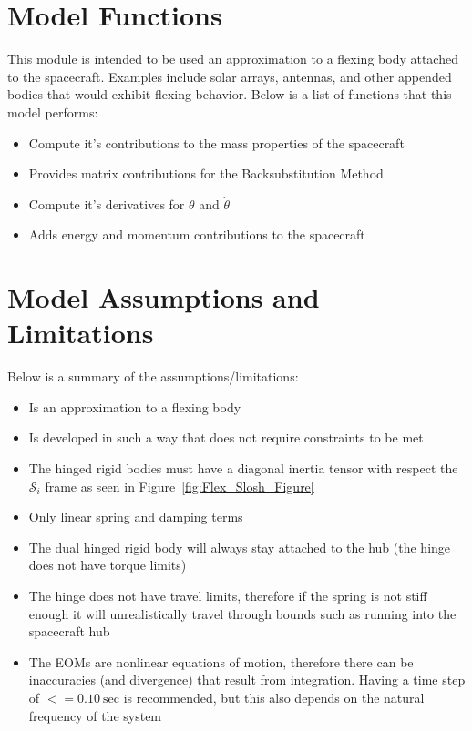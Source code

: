 \section{Model Functions}

This module is intended to be used an approximation to a flexing body attached to the spacecraft. Examples include solar arrays, antennas, and other appended bodies that would exhibit flexing behavior. Below is a list of functions that this model performs:

\begin{itemize}
	\item Compute it's contributions to the mass properties of the spacecraft
	\item Provides matrix contributions for the Backsubstitution Method
	\item Compute it's derivatives for $\theta$ and $\dot{\theta}$
	\item Adds energy and momentum contributions to the spacecraft
\end{itemize}

\section{Model Assumptions and Limitations}
Below is a summary of the assumptions/limitations:

\begin{itemize}
	\item Is an approximation to a flexing body
	\item Is developed in such a way that does not require constraints to be met
	\item The hinged rigid bodies must have a diagonal inertia tensor with respect the $\mathcal{S}_i$ frame as seen in Figure~\ref{fig:Flex_Slosh_Figure}
	\item Only linear spring and damping terms
	\item The dual hinged rigid body will always stay attached to the hub (the hinge does not have torque limits)
	\item The hinge does not have travel limits, therefore if the spring is not stiff enough it will unrealistically travel through bounds such as running into the spacecraft hub
	\item The EOMs are nonlinear equations of motion, therefore there can be inaccuracies (and divergence) that result from integration. Having a time step of $<= 0.10\ \text{sec}$ is recommended, but this also depends on the natural frequency of the system
\end{itemize}
